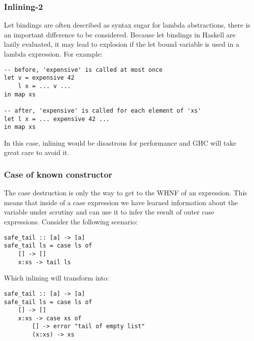 \subsubsection{Inlining-2}
\label{section:background:inlining2}

Let bindings are often described as syntax sugar for lambda abstractions, there is an important difference to be considered.
Because let bindings in Haskell are lazily evaluated, it may lead to explosion if the let bound variable is used in a lambda
expression. For example:

\begin{listing}[H]
\begin{verbatim}
-- before, 'expensive' is called at most once
let v = expensive 42
    l x = ... v ...
in map xs

-- after, 'expensive' is called for each element of 'xs'
let l x = ... expensive 42 ...
in map xs
\end{verbatim}
\end{listing}

In this case, inlining would be disastrous for performance and GHC will take great care to avoid it. 

\subsubsection{Case of known constructor}

The case destruction is only the way to get to the WHNF of an expression. This means that inside of a case expression
we have learned information about the variable under scrutiny and can use it to infer the result of outer case expressions.
Consider the following scenario:

\begin{listing}[H]
\begin{verbatim}
safe_tail :: [a] -> [a]
safe_tail ls = case ls of
    [] -> []
    x:xs -> tail ls
\end{verbatim}
\end{listing}

Which inlining will transform into:

\begin{listing}[H]
\begin{verbatim}
safe_tail :: [a] -> [a]
safe_tail ls = case ls of
    [] -> []
    x:xs -> case xs of
        [] -> error "tail of empty list"
        (x:xs) -> xs
\end{verbatim}
\end{listing}

